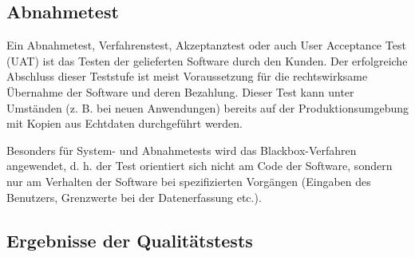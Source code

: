 \subsection{Abnahmetest}

Ein Abnahmetest, Verfahrenstest, Akzeptanztest oder auch User Acceptance Test (UAT) ist das Testen der gelieferten Software durch den Kunden. Der erfolgreiche Abschluss dieser Teststufe ist meist Voraussetzung für die rechtswirksame Übernahme der Software und deren Bezahlung. Dieser Test kann unter Umständen (z. B. bei neuen Anwendungen) bereits auf der Produktionsumgebung mit Kopien aus Echtdaten durchgeführt werden.

Besonders für System- und Abnahmetests wird das Blackbox-Verfahren angewendet, d. h. der Test orientiert sich nicht am Code der Software, sondern nur am Verhalten der Software bei spezifizierten Vorgängen (Eingaben des Benutzers, Grenzwerte bei der Datenerfassung etc.).

\subsection{Ergebnisse der Qualitätstests}
